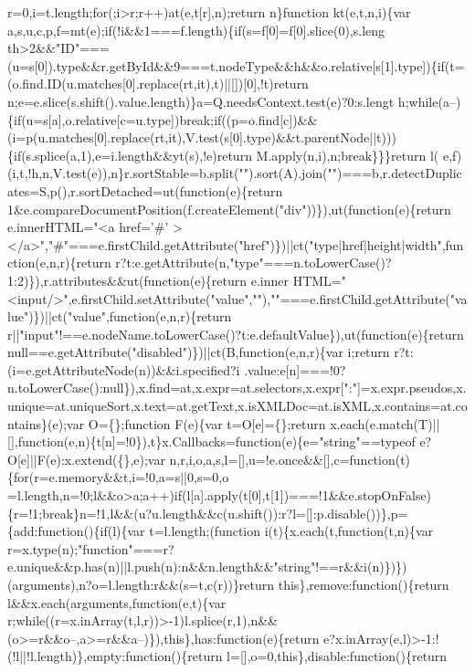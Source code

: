 \begin{DoxyCode}
{       r=0,i=t.length;for(;i>r;r++)at(e,t[r],n);return n\}function kt(e,t,n,i)\{var
       a,s,u,c,p,f=mt(e);if(!i&&1===f.length)\{if(s=f[0]=f[0].slice(0),s.leng
      th>2&&"ID"===(u=s[0]).type&&r.getById&&9===t.nodeType&&h&&o.relative[s[1].type])\{if(t=(o.find.ID(u.matches[0].replace(rt,it),t)||[])[0],!t)return
       n;e=e.slice(s.shift().value.length)\}a=Q.needsContext.test(e)?0:s.lengt
      h;while(a--)\{if(u=s[a],o.relative[c=u.type])break;if((p=o.find[c])&&(i=p(u.matches[0].replace(rt,it),V.test(s[0].type)&&t.parentNode||t)))\{if(s.splice(a,1),e=i.length&&yt(s),!e)return M.apply(n,i),n;break\}\}\}return
       l(
      e,f)(i,t,!h,n,V.test(e)),n\}r.sortStable=b.split("").sort(A).join("")===b,r.detectDuplicates=S,p(),r.sortDetached=ut(function(e)\{return 1&e.compareDocumentPosition(f.createElement("div"))\}),ut(function(e)\{return
       e.innerHTML="<a href='}#\textcolor{stringliteral}{'
      ></a>","#"===e.firstChild.getAttribute("href")\})||ct("type|href|height|width",function(e,n,r)\{return r?t:e.getAttribute(n,"type"===n.toLowerCase()?1:2)\}),r.attributes&&ut(function(e)\{return
       e.inner
      HTML="<input/>",e.firstChild.setAttribute("value",""),""===e.firstChild.getAttribute("value")\})||ct("value",function(e,n,r)\{return r||"input"!==e.nodeName.toLowerCase()?t:e.defaultValue\}),ut(function(e)\{return
       null==e.getAttribute("disabled")\})||ct(B,function(e,n,r)\{var i;return
       r?t:(i=e.getAttributeNode(n))&&i.specified?i
      .value:e[n]===!0?n.toLowerCase():null\}),x.find=at,x.expr=at.selectors,x.expr[":"]=x.expr.pseudos,x.unique=at.uniqueSort,x.text=at.getText,x.isXMLDoc=at.isXML,x.contains=at.contains\}(e);var O=\{\};function F(e)\{var
       t=O[e]=\{\};return x.each(e.match(T)||[],function(e,n)\{t[n]=!0\}),t\}x.Callbacks=function(e)\{e="string"==typeof
       e?O[e]||F(e):x.extend(\{\},e);var
       n,r,i,o,a,s,l=[],u=!e.once&&[],c=function(t)\{for(r=e.memory&&t,i=!0,a=s||0,s=0,o
      =l.length,n=!0;l&&o>a;a++)if(l[a].apply(t[0],t[1])===!1&&e.stopOnFalse)\{r=!1;break\}n=!1,l&&(u?u.length&&c(u.shift()):r?l=[]:p.disable())\},p=\{add:function()\{if(l)\{var t=l.length;(function
       i(t)\{x.each(t,function(t,n)\{var
       r=x.type(n);"function"===r?e.unique&&p.has(n)||l.push(n):n&&n.length&&"string"!==r&&i(n)\})\})(arguments),n?o=l.length:r&&(s=t,c(r))\}return this\},remove:function()\{return l&&x.each(arguments,function(e,t)\{var
       r;while((r=x.inArray(t,l,r))>-1)l.splice(r,1),n&&(o>=r&&o--,a>=r&&a--)\}),this\},has:function(e)\{return
       e?x.inArray(e,l)>-1:!(!l||!l.length)\},empty:function()\{return l=[],o=0,this\},disable:function()\{return
}
\end{DoxyCode}
